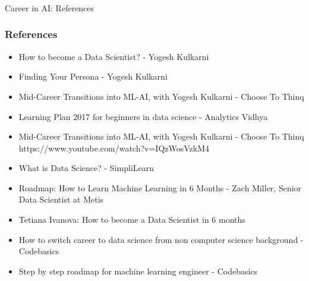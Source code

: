 \begin{frame}[fragile]\frametitle{}
\begin{center}
{\Large Career in AI: References}
\end{center}
\end{frame}

\begin{frame}[fragile]\frametitle{References}
\begin{itemize}
\item How to become a Data Scientist? - Yogesh Kulkarni 
\item Finding Your Persona - Yogesh Kulkarni 
\item Mid-Career Transitions into ML-AI, with Yogesh Kulkarni - Choose To Thinq
\item Learning Plan 2017 for beginners in data science - Analytics Vidhya
\item Mid-Career Transitions into ML-AI, with Yogesh Kulkarni - Choose To Thinq https://www.youtube.com/watch?v=IQzWosVzkM4
\item What is Data Science? - SimpliLearn
\item Roadmap: How to Learn Machine Learning in 6 Months -  Zach Miller, Senior Data Scientist at Metis
\item Tetiana Ivanova: How to become a Data Scientist in 6 months
\item How to switch career to data science from non computer science background - Codebasics
\item Step by step roadmap for machine learning engineer - Codebasics
\end{itemize}
\end{frame}

